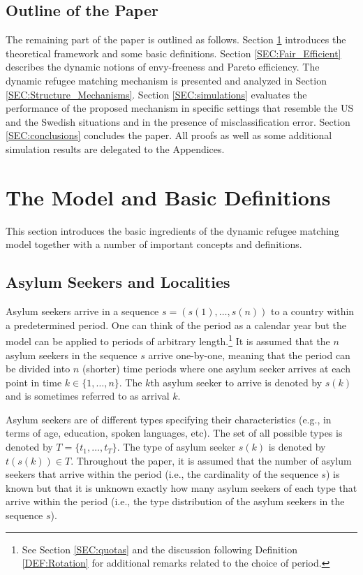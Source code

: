 \documentclass[12pt,fleqn]{article}
\begin{document}
\subsection{Outline of the Paper}
The remaining part of the paper is outlined as follows. Section \ref{SEC:Model} introduces the theoretical framework and some basic definitions. Section \ref{SEC:Fair_Efficient} describes the dynamic notions of envy-freeness and Pareto efficiency. The dynamic refugee matching mechanism is presented and analyzed in Section \ref{SEC:Structure_Mechanisms}. Section \ref{SEC:simulations} evaluates the performance of the proposed mechanism in specific settings that resemble the US and the Swedish situations and in the presence of misclassification error. Section \ref{SEC:conclusions} concludes the paper. All proofs as well as some additional simulation results are delegated to the Appendices.

\section{The Model and Basic Definitions}\label{SEC:Model}
This section introduces the basic ingredients of the dynamic refugee matching model together with a number of important concepts and definitions.

\subsection{Asylum Seekers and Localities}
Asylum seekers arrive in a sequence $s=(s(1),\ldots,s(n))$ to a country within a predetermined period. One can think of the period as a calendar year but the model can be applied to periods of arbitrary length.\footnote{See Section \ref{SEC:quotas} and the discussion following Definition \ref{DEF:Rotation} for additional remarks related to the choice of period.} It is assumed that the $n$ asylum seekers in the sequence $s$ arrive one-by-one, meaning that the period can be divided into $n$ (shorter) time periods where one asylum seeker arrives at each point in time $k\in\{1,\ldots,n\}$. The $k$th asylum seeker to arrive is denoted by $s(k)$ and is sometimes referred to as arrival $k$.

Asylum seekers are of different types specifying their characteristics (e.g., in terms of age, education, spoken languages, etc). The set of all possible types is denoted by $T=\{t_1,\ldots,t_T\}$. The type of asylum seeker $s(k)$ is denoted by $t(s(k))\in T$. Throughout the paper, it is assumed that the number of asylum seekers that arrive within the period (i.e., the cardinality of the sequence $s$) is known but that it is unknown exactly how many asylum seekers of each type that arrive within the period (i.e., the type distribution of the asylum seekers in the sequence $s$).
\end{document}
